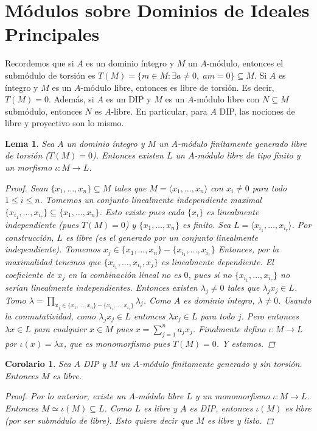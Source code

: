 \documentclass[12pt]{book}
\newtheorem{lem}[teo]{Lema}
\newtheorem{cor}[teo]{Corolario}
\theoremstyle{definition}
\begin{document}
\section{Módulos sobre Dominios de Ideales Principales}

Recordemos que si $A$ es un dominio íntegro y $M$ un $A$-módulo, entonces el submódulo de torsión es $T(M) = \{m\in M : \exists a\neq 0, \; am=0\}\subseteq M$. Si $A$ es íntegro y $M$ es un $A$-módulo libre, entonces es libre de torsión. Es decir, $T(M)=0$. Además, si $A$ es un DIP y $M$ es un $A$-módulo libre con $N\subseteq M$ submódulo, entonces $N$ es $A$-libre. En particular, para $A$ DIP, las nociones de libre y proyectivo son lo mismo.

\begin{lem}
Sea $A$ un dominio íntegro y $M$ un $A$-módulo finitamente generado libre de torsión ($T(M)=0$). Entonces existen $L$ un $A$-módulo libre de tipo finito y un morfismo $\iota:M\to L$.
\begin{proof}
Sean $\{x_1,\ldots , x_n\}\subseteq M$ tales que $M=\langle x_1,\ldots , x_n\rangle$ con $x_i\neq 0$ para todo $1\leq i\leq n$. Tomemos un conjunto linealmente independiente maximal $\{x_{i_1},\ldots , x_{i_r}\}\subseteq \{x_1,\ldots , x_n\}$. Esto existe pues cada $\{x_i\}$ es linealmente independiente (pues $T(M)=0$) y  $\{x_1,\ldots , x_n\}$ es finito. Sea $L=\langle x_{i_1},\ldots , x_{i_r}\rangle$. Por construcción, $L$ es libre (es el generado por un conjunto linealmente independiente). Tomemos $x_j\in \{x_1,\ldots , x_n\}-\{x_{i_1},\ldots , x_{i_r}\}$ Entonces, por la maximalidad tenemos que $\{x_{i_1},\ldots , x_{i_r},x_j\}$ es linealmente dependiente. El coeficiente de $x_j$ en la combinación lineal no es $0$, pues si no $\{x_{i_1},\ldots , x_{i_r}\}$ no serían linealmente independientes. Entonces existen $\lambda_j\neq 0$ tales que $\lambda_j x_j\in L$. Tomo $\lambda = \displaystyle\prod_{x_j\in \{x_1,\ldots , x_n\}-\{x_{i_1},\ldots , x_{i_r}\}} \lambda_j $. Como $A$ es dominio íntegro, $\lambda \neq 0$. Usando la conmutatividad, como $\lambda_j x_j\in L$ entonces $\lambda x_j\in L$ para todo $j$. Pero entonces $\lambda x \in L$ para cualquier $x\in M$ pues $x=\displaystyle\sum_{j=1}^n a_jx_j$. Finalmente defino $\iota:M\to L$ por $\iota(x) = \lambda x$, que es monomorfismo pues $T(M)=0$. Y estamos.
\end{proof}
\end{lem}

\begin{cor}
Sea $A$ DIP y $M$ un $A$-módulo finitamente generado y sin torsión. Entonces $M$ es libre.
\begin{proof}
Por lo anterior, existe un $A$-módulo libre $L$ y un monomorfismo $\iota:M\to L$. Entonces $M\simeq \iota(M)\subseteq L$. Como $L$ es libre y $A$ es DIP, entonces $\iota(M)$ es libre (por ser submódulo de libre). Esto quiere decir que $M$ es libre y listo.
\end{proof}
\end{cor}
\end{document}
